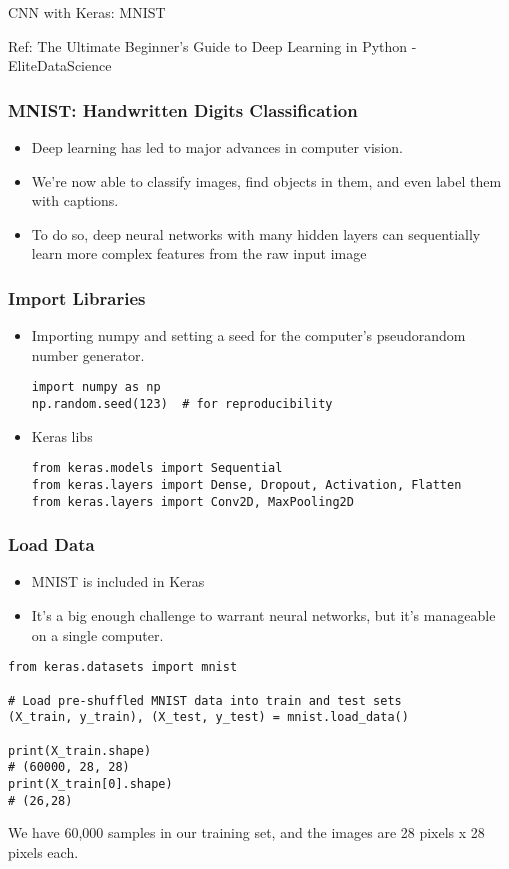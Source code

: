 \begin{frame}
  \begin{center}
    {\Large CNN with Keras: MNIST}
    
    {Ref: The Ultimate Beginner's Guide to Deep Learning in Python - EliteDataScience}
  \end{center}
\end{frame}

\begin{frame}[fragile] \frametitle{MNIST: Handwritten Digits Classification}
\begin{itemize}
\item Deep learning has led to major advances in computer vision. 
\item We're now able to classify images, find objects in them, and even label them with captions. 
\item To do so, deep neural networks with many hidden layers can sequentially learn more complex features from the raw input image
\end{itemize}
\end{frame}

\begin{frame}[fragile] \frametitle{Import Libraries}

\begin{itemize}
\item Importing numpy and setting a seed for the computer's pseudorandom number generator.
\begin{lstlisting}
import numpy as np
np.random.seed(123)  # for reproducibility
\end{lstlisting}
\item Keras libs
\begin{lstlisting}
from keras.models import Sequential
from keras.layers import Dense, Dropout, Activation, Flatten
from keras.layers import Conv2D, MaxPooling2D
\end{lstlisting}
\end{itemize}
\end{frame}

\begin{frame}[fragile] \frametitle{Load Data}

\begin{itemize}
\item MNIST is included in Keras
\item It's a big enough challenge to warrant neural networks, but it's manageable on a single computer. 
\end{itemize}
\begin{lstlisting}
from keras.datasets import mnist
 
# Load pre-shuffled MNIST data into train and test sets
(X_train, y_train), (X_test, y_test) = mnist.load_data()

print(X_train.shape)
# (60000, 28, 28)
print(X_train[0].shape)
# (26,28)
\end{lstlisting}
We have 60,000 samples in our training set, and the images are 28 pixels x 28 pixels each.
\end{frame}

